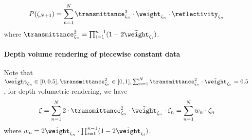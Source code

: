 \begin{align}
P(\zeta_{N+1}) = \sum_{n=1}^N \transmittance^2_{\zeta_n} \cdot \tilde{\weight}_{\zeta_n} \cdot \reflectivity_{\zeta_n}
\label{eq:final_radiant2}
\end{align}
where $\transmittance^2_{\zeta_n} = \prod_{i=1}^{n-1}(1-2\tilde{\weight}_{\zeta_i})$.


\paragraph{Depth volume rendering of piecewise constant data}
Note that $\tilde{\weight}_{\zeta_n} \in [0, 0.5], \transmittance^2_{\zeta_n} \in [0,1], \sum_{n=1}^N \transmittance^2_{\zeta_n} \cdot \tilde{\weight}_{\zeta_n} = 0.5$, for depth volumetric rendering, we have 
\begin{align}
    \zeta = \sum_{n=1}^N 2 \cdot \transmittance^2_{\zeta_n} \cdot \tilde{\weight}_{\zeta_n} \cdot \zeta_n
    =\sum_{n=1}^N w_n \cdot \zeta_n
    \label{eq:depth_render}
\end{align}
where $w_n = 2\tilde{\weight}_{\zeta_n} \cdot \prod_{i=1}^{n-1}(1-2\tilde{\weight}_{\zeta_i})$.